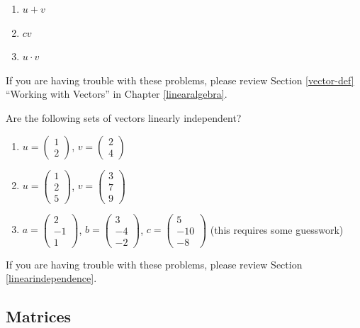 \documentclass[
]{book}
\providecommand{\tightlist}{%
  \setlength{\itemsep}{0pt}\setlength{\parskip}{0pt}}
\theoremstyle{definition}
\theoremstyle{definition}
\theoremstyle{definition}
\theoremstyle{definition}
\theoremstyle{remark}
\begin{document}
\begin{enumerate}
\def\labelenumi{\arabic{enumi}.}
\tightlist
\item
  \(u + v\)
\item
  \(cv\)
\item
  \(u \cdot v\)
\end{enumerate}

If you are having trouble with these problems, please review Section \ref{vector-def} ``Working with Vectors'' in Chapter \ref{linearalgebra}.

Are the following sets of vectors linearly independent?

\begin{enumerate}
\def\labelenumi{\arabic{enumi}.}
\item
  \(u = \begin{pmatrix} 1\\ 2\end{pmatrix}\), \(v = \begin{pmatrix} 2\\4\end{pmatrix}\)
\item
  \(u = \begin{pmatrix} 1\\ 2\\ 5 \end{pmatrix}\), \(v = \begin{pmatrix} 3\\ 7\\ 9 \end{pmatrix}\)
\item
  \(a = \begin{pmatrix} 2\\ -1\\ 1 \end{pmatrix}\), \(b = \begin{pmatrix} 3\\ -4\\ -2 \end{pmatrix}\), \(c = \begin{pmatrix} 5\\ -10\\ -8 \end{pmatrix}\) (this requires some guesswork)
\end{enumerate}

If you are having trouble with these problems, please review Section \ref{linearindependence}.

\hypertarget{matrices}{%
\subsection*{Matrices}\label{matrices}}
\end{document}
